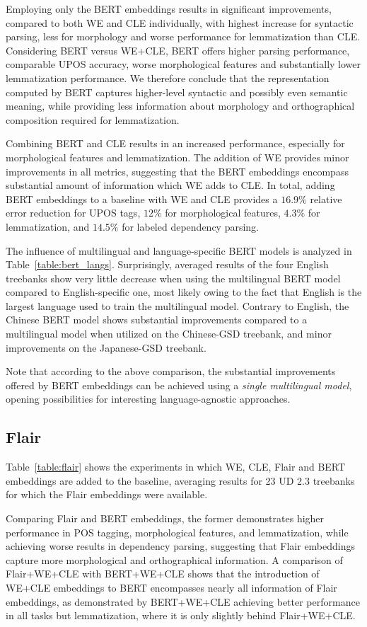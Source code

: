 \documentclass[11pt,a4paper]{article}
\begin{document}
Employing only the BERT embeddings results in significant improvements,
compared to both WE and CLE individually, with highest increase for syntactic parsing,
less for morphology and worse performance for lemmatization than CLE.
Considering BERT versus WE+CLE, BERT offers higher parsing
performance, comparable UPOS accuracy, worse morphological features and
substantially lower lemmatization performance. We therefore conclude that the
representation computed by BERT captures higher-level syntactic and possibly
even semantic meaning, while providing less information about morphology
and orthographical composition required for lemmatization.

Combining BERT and CLE results in an increased performance, especially for
morphological features and lemmatization. The addition of WE
provides minor improvements in all metrics, suggesting that the BERT embeddings
encompass substantial amount of information which WE adds to CLE.
In total, adding BERT embeddings to a baseline with WE and CLE
provides a $16.9\%$ relative error reduction for UPOS tags, $12\%$ for
morphological features, $4.3\%$ for lemmatization, and $14.5\%$ for labeled
dependency parsing.

The influence of multilingual and language-specific BERT models is analyzed in
Table~\ref{table:bert_langs}. Surprisingly, averaged results of the four
English treebanks show very little decrease when using the multilingual BERT
model compared to English-specific one, most likely owing to the fact that
English is the largest language used to train the multilingual model.
Contrary to
English, the Chinese BERT model shows substantial improvements compared to
a multilingual model when utilized on the Chinese-GSD treebank, and
minor improvements on the Japanese-GSD treebank.

Note that according to the above comparison, the substantial improvements
offered by BERT embeddings can be achieved using a \emph{single multilingual
model}, opening possibilities for interesting language-agnostic approaches.

\subsection{Flair}

Table~\ref{table:flair} shows the experiments in which WE, CLE, Flair and BERT
embeddings are added to the baseline, averaging results for 23 UD 2.3 treebanks
for which the Flair embeddings were available. 

Comparing Flair and BERT embeddings, the former demonstrates higher performance
in POS tagging, morphological features, and lemmatization, while
achieving worse results in dependency parsing, suggesting that Flair embeddings
capture more morphological and orthographical information. A comparison of Flair+WE+CLE with BERT+WE+CLE shows that the introduction of
WE+CLE embeddings to BERT encompasses nearly all information of Flair
embeddings, as demonstrated by BERT+WE+CLE achieving better performance in all
tasks but lemmatization, where it is only slightly behind Flair+WE+CLE.
\end{document}
